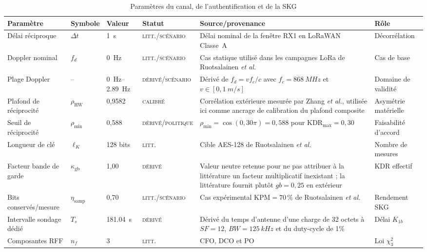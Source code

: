 \documentclass[conference,a4paper]{IEEEtran}
\newcommand{\statusLit}{\textsc{litt.}}
\newcommand{\statusDer}{\textsc{dérivé}}
\newcommand{\statusScen}{\textsc{scénario}}
\newcommand{\statusPol}{\textsc{politique}}
\newcommand{\statusCal}{\textsc{calibré}}
\newcommand{\KDR}{\mathrm{KDR}}
\begin{document}
\begin{table}[H]
\caption{Paramètres du canal, de l'authentification et de la SKG}
\label{tab:params-phy}
\centering\scriptsize
\begin{tabularx}{\textwidth}{@{}l l l l Y Y@{}}
\toprule
Paramètre & Symbole & Valeur & Statut & Source/provenance & Rôle \\
\midrule
Délai réciproque & $\Delta t$ & \SI{1}{s} & \statusLit{}/\statusScen{} & Délai nominal de la fenêtre RX1 en LoRaWAN Classe~A \cite{lorawan104} & Décorrélation \\
Doppler nominal & $f_d$ & \SI{0}{Hz} & \statusLit{}/\statusScen{} & Cas statique utilisé dans les campagnes LoRa de Ruotsalainen \emph{et al.} \cite{ruotsalainen2018,ruotsalainen2020} & Cas de base \\
Plage Doppler & -- & \SIrange{0}{2.89}{Hz} & \statusDer{}/\statusScen{} & Dérivé de $f_d=v f_c/c$ avec $f_c=\SI{868}{MHz}$ et $v\in[0,\SI{1}{m/s}]$ & Domaine de validité \\
Plafond de réciprocité & $\rho_{\mathrm{HW}}$ & 0,9582 & \statusCal{} & Corrélation extérieure mesurée par Zhang \emph{et al.}, utilisée ici comme ancrage de calibration du plafond composite \cite{zhang2018} & Asymétrie matérielle \\
Seuil de réciprocité & $\rho_{\min}$ & 0,588 & \statusDer{}/\statusPol{} & $\rho_{\min}=\cos(0{,}30\pi)=0{,}588$ pour $\KDR_{\max}=0{,}30$ & Faisabilité d'accord \\
Longueur de clé & $\ell_K$ & 128 bits & \statusLit{} & Cible AES-128 de Ruotsalainen \emph{et al.} \cite[Sec.~V-C]{ruotsalainen2020} & Nombre de mesures \\
Facteur bande de garde & $\kappa_{\mathrm{gb}}$ & 1,00 & \statusDer{} & Valeur neutre retenue pour ne pas attribuer à la littérature un facteur multiplicatif inexistant ; la littérature fournit plutôt $gb=0{,}25$ en extérieur \cite{ruotsalainen2020} & KDR effectif \\
Bits conservés/mesure & $\eta_{\mathrm{samp}}$ & 0,70 & \statusLit{}/\statusScen{} & Cas expérimental $\mathrm{KPM}=70\,\%$ de Ruotsalainen \emph{et al.} \cite[Sec.~V-C]{ruotsalainen2020} & Rendement SKG \\
Intervalle sondage dédié & $T_s$ & \SI{181.04}{s} & \statusDer{} & Dérivé du temps d'antenne d'une charge de 32 octets à $SF=12$, $BW=\SI{125}{kHz}$ et du duty-cycle de 1\% \cite[Sec.~4.1.1.6]{sx1276ds} & Délai $K_{1b}$ \\
Composantes RFF & $n_f$ & 3 & \statusLit{} & CFO, DCO et PO \cite{alla2024} & Loi $\chi^2_3$ \\

\end{tabularx}
\end{table}
\end{document}
